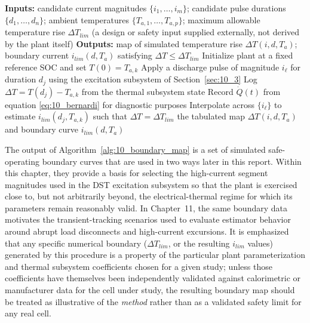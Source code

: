 \begin{algorithm}[htbp]
\caption{Simulated thermal boundary mapping using the coupled plant}
\label{alg:10_boundary_map}
\begin{algorithmic}[1]
\State \textbf{Inputs:} candidate current magnitudes $\{i_1,\dots,i_m\}$; candidate pulse durations $\{d_1,\dots,d_n\}$; ambient temperatures $\{T_{a,1},\dots,T_{a,p}\}$; maximum allowable temperature rise $\Delta T_{lim}$ (a design or safety input supplied externally, not derived by the plant itself)
\State \textbf{Outputs:} map of simulated temperature rise $\Delta T(i, d, T_a)$; boundary current $i_{lim}(d, T_a)$ satisfying $\Delta T \le \Delta T_{lim}$
    \State Initialize plant at a fixed reference SOC and set $T(0) = T_{a,k}$
            \State Apply a discharge pulse of magnitude $i_\ell$ for duration $d_j$ using the excitation subsystem of Section~\ref{sec:10_3}
            \State Log $\Delta T = T(d_j) - T_{a,k}$ from the thermal subsystem state
            \State Record $\dot Q(t)$ from equation \eqref{eq:10_bernardi} for diagnostic purposes
        \EndFor
        \State Interpolate across $\{i_\ell\}$ to estimate $i_{lim}(d_j, T_{a,k})$ such that $\Delta T = \Delta T_{lim}$
    \EndFor
\EndFor
\State \Return the tabulated map $\Delta T(i,d,T_a)$ and boundary curve $i_{lim}(d,T_a)$
\end{algorithmic}
\end{algorithm}

The output of Algorithm~\ref{alg:10_boundary_map} is a set of
simulated safe-operating boundary curves that are used in two ways
later in this report. Within this chapter, they provide a basis for
selecting the high-current segment magnitudes used in the DST
excitation subsystem so that the plant is exercised close to, but not
arbitrarily beyond, the electrical-thermal regime for which its
parameters remain reasonably valid. In Chapter~11, the same boundary
data motivates the transient-tracking scenarios used to evaluate
estimator behavior around abrupt load disconnects and high-current
excursions. It is emphasized that any specific numerical boundary
($\Delta T_{lim}$, or the resulting $i_{lim}$ values) generated by this
procedure is a property of the particular plant parameterization and
thermal subsystem coefficients chosen for a given study; unless those
coefficients have themselves been independently validated against
calorimetric or manufacturer data for the cell under study, the
resulting boundary map should be treated as illustrative of the
\emph{method} rather than as a validated safety limit for any real
cell.

